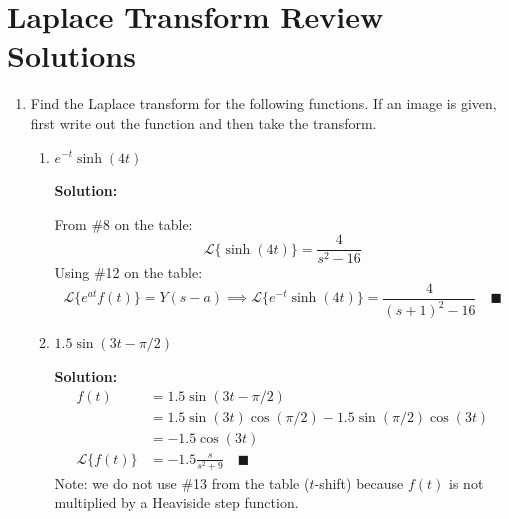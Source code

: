 \documentclass[letterpaper, fontsize=11pt]{scrartcl} %
\numberwithin{equation}{section} %
\numberwithin{figure}{section} %
\numberwithin{table}{section} %
\begin{document}

\newcommand{\horrule}[1]{\rule{\linewidth}{#1}} %


\section*{Laplace Transform Review Solutions}

\begin{enumerate}
\item Find the Laplace transform for the following functions. If an image is given, first write out the function and then take the transform.

\begin{enumerate}

\item $e^{-t}\sinh (4t)$
\par \textbf{Solution:}
\par From \#8 on the table: $$\mathcal{L}\{\sinh(4t)\} = \frac{4}{s^2 - 16}$$
Using \#12 on the table: 
$$\mathcal{L}\{e^{at}f(t)\} = Y(s-a) \implies \mathcal{L}\{e^{-t}\sinh(4t)\} = \frac{4}{(s+1)^2 - 16}\quad\blacksquare$$

\item $1.5\sin(3t-\pi/2)$
\par \textbf{Solution:}
\begin{align*}
f(t) &= 1.5\sin(3t - \pi/2)\\
&= 1.5\sin(3t)\cos(\pi/2) - 1.5\sin(\pi/2)\cos(3t)\\
&= -1.5\cos(3t)\\
\mathcal{L}\{f(t)\} &= -1.5\frac{s}{s^2 + 9} \quad\blacksquare
\end{align*}
Note: we do not use \#13 from the table ($t$-shift) because $f(t)$ is not multiplied by a Heaviside step function.


\end{enumerate}
\end{enumerate}
\end{document}
